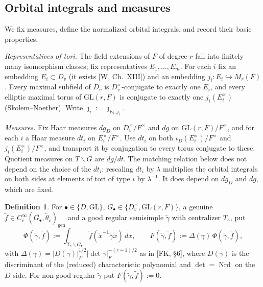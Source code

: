 \documentclass[12pt]{article}
\newcommand{\ov}[1]{\overline{#1}}
\newcommand{\gen}{\mathrm{gen}}
\newcommand{\Nrd}{\operatorname{Nrd}}
\newcommand{\GL}{\mathrm{GL}}
\newcommand{\iD}{\iota_D}
\newcommand{\jj}{\jmath}
\theoremstyle{plain}
\theoremstyle{definition}
\newtheorem{definition}[theorem]{Definition}
\begin{document}
\subsection{Orbital integrals and measures}\label{subsec:oi}
We fix measures, define the normalized orbital integrals, and record their basic properties.

\emph{Representatives of tori.} The field extensions of $F$ of degree $r$ fall into finitely many isomorphism classes; fix representatives $E_1,\dots,E_m$. For each $i$ fix an embedding $E_i\subset D_v$ (it exists [W, Ch.~XIII]) and an embedding $j_i:E_i\hookrightarrow M_r(F)$. Every maximal subfield of $D_v$ is $D_v^\times$-conjugate to exactly one $E_i$, and every elliptic maximal torus of $\GL(r,F)$ is conjugate to exactly one $j_i(E_i^\times)$ (Skolem--Noether). Write $\jj_i:=\jj_{E_i,j_i}$.

\emph{Measures.} Fix Haar measures $dg_D$ on $D_v^\times/F^\times$ and $dg$ on $\GL(r,F)/F^\times$, and for each $i$ a Haar measure $dt_i$ on $E_i^\times/F^\times$. Use $dt_i$ on both $\iD(E_i^\times)/F^\times$ and $j_i(E_i^\times)/F^\times$, and transport it by conjugation to every torus conjugate to these. Quotient measures on $T\backslash G$ are $dg/dt$. The matching relation below does not depend on the choice of the $dt_i$: rescaling $dt_i$ by $\lambda$ multiplies the orbital integrals on both sides at elements of tori of type $i$ by $\lambda^{-1}$. It does depend on $dg_D$ and $dg$, which are fixed.

\begin{definition}\label{def:oi}
For $\bullet\in\{D,\GL\}$, $G_\bullet\in\{D_v^\times,\GL(r,F)\}$, a genuine $\tilde f\in C_c^\infty(\ov{G_\bullet},\tilde\theta_v)_\gen$ and a good regular semisimple $\tilde\gamma$ with centralizer $T_\gamma$, put
\[ \Phi(\tilde\gamma,\tilde f):=\int_{T_\gamma\backslash G_\bullet}\tilde f(\tilde x^{-1}\tilde\gamma\tilde x)\,d\dot x,\qquad F(\tilde\gamma,\tilde f):=\Delta(\gamma)\,\Phi(\tilde\gamma,\tilde f), \]
with $\Delta(\gamma)=|D(\gamma)|_F^{1/2}|\det\gamma|_F^{-(r-1)/2}$ as in [FK, \S6], where $D(\gamma)$ is the discriminant of the (reduced) characteristic polynomial and $\det=\Nrd$ on the $D$ side. For non-good regular $\tilde\gamma$ put $F(\tilde\gamma,\tilde f):=0$.
\end{definition}
\end{document}
